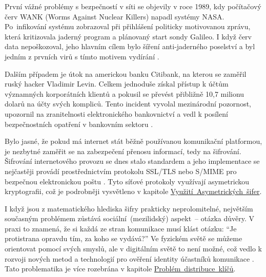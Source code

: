 První vážné problémy s bezpečností v síti se objevily v roce 1989, kdy počítačový červ WANK (Worms Against Nuclear Killers) napadl systémy NASA. Po~infikování systému zobrazoval při přihlášení politicky motivovanou zprávu, která kritizovala jaderný program a plánovaný start sondy Galileo. I když červ data nepoškozoval, jeho hlavním cílem bylo šíření anti-jaderného poselství a byl jedním z prvních virů s tímto motivem vydírání \parencite{erben2014}.

Dalším případem je útok na americkou banku Citibank, na kterou se zaměřil ruský hacker Vladimir Levin. Celkem jednoduše získal přístup k účtům významných korporátních klientů a pokusil se převést přibližně 10,7 milionu dolarů na účty svých kompliců. Tento incident vyvolal mezinárodní pozornost, upozornil na zranitelnosti elektronického bankovnictví a vedl k posílení bezpečnostních opatření v bankovním sektoru \parencite{erben2014}.

Bylo jasné, že pokud má internet stát běžně používanou komunikační platformou, je nezbytné zaměřit se na zabezpečení přenosu informací, tedy na šifrování. Šifrování internetového provozu se dnes stalo standardem a jeho implementace se nejčastěji provádí prostřednictvím protokolu SSL/TLS nebo S/MIME pro bezpečnou elektronickou poštu \parencite{pavlicek2012}. Tyto síťové protokoly využívají asymetrickou kryptografii, což je podrobněji vysvětleno v kapitole \mbox{\hyperref[sec:asymetricka-kryptografie]{Využití Asymetrických šifer}.}

I když jsou z matematického hlediska šifry prakticky neprolomitelné, největším současným problémem zůstává sociální~(mezilidský) aspekt~-- otázka důvěry. V praxi to znamená, že si každá ze stran komunikace musí klást otázku: \enquote{Je protistrana opravdu tím, za koho se vydává?} Ve fyzickém světě se můžeme orientovat pomocí svých smyslů, ale v digitálním světě to není možné, což vedlo k rozvoji nových metod a technologií pro ověření identity účastníků komunikace \parencite{burda2019}. Tato problematika je více rozebrána v kapitole \mbox{\hyperref[sec:distribuce-klicu]{Problém distribuce klíčů}.}

\newpage